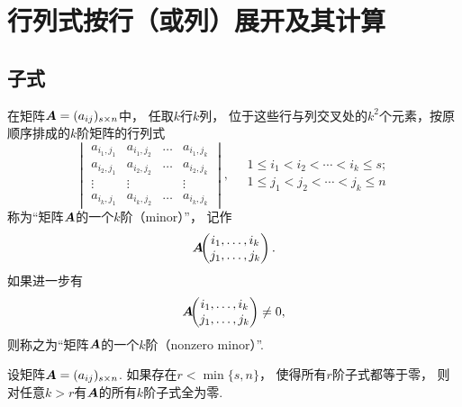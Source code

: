 \section{行列式按行（或列）展开及其计算}
\subsection{子式}
\begin{definition}
在矩阵\(\boldsymbol{A}=(a_{ij})_{s \times n}\)中，
任取\(k\)行\(k\)列，
位于这些行与列交叉处的\(k^2\)个元素，按原顺序排成的\(k\)阶矩阵的行列式\begin{equation*}
	\begin{vmatrix}
		a_{i_1,j_1} & a_{i_1,j_2} & \dots & a_{i_1,j_k} \\
		a_{i_2,j_1} & a_{i_2,j_2} & \dots & a_{i_2,j_k} \\
		\vdots & \vdots & & \vdots \\
		a_{i_k,j_1} & a_{i_k,j_2} & \dots & a_{i_k,j_k}
	\end{vmatrix},
	\quad
	\begin{array}{c}
		1 \leq i_1 < i_2 < \dotsb < i_k \leq s; \\
		1 \leq j_1 < j_2 < \dotsb < j_k \leq n
	\end{array}
\end{equation*}称为“矩阵\(\boldsymbol{A}\)的一个\(k\)阶（minor）”，
记作\begin{equation*}
	\MatrixMinor{\vb{A}}{
		\AutoTuple{i}{k} \\
		\AutoTuple{j}{k}
	}.
\end{equation*}
如果进一步有\begin{equation*}
	\MatrixMinor{\vb{A}}{
		\AutoTuple{i}{k} \\
		\AutoTuple{j}{k}
	}
	\neq 0,
\end{equation*}
则称之为“矩阵\(\boldsymbol{A}\)的一个\(k\)阶（nonzero minor）”.
\end{definition}

\begin{property}
设矩阵\(\boldsymbol{A} = (a_{ij})_{s \times n}\).
如果存在\(r < \min\{s,n\}\)，
使得所有\(r\)阶子式都等于零，
则对任意\(k > r\)有\(\boldsymbol{A}\)的所有\(k\)阶子式全为零.
\end{property}

